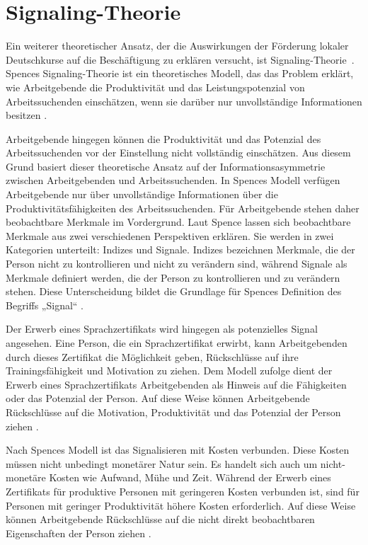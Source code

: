 \section{Signaling-Theorie}
\label{cha:Signal}

Ein weiterer theoretischer Ansatz, der die Auswirkungen der Förderung lokaler Deutschkurse auf die Beschäftigung zu erklären versucht, ist Signaling-Theorie~\parencite{Spence1973}. Spences Signaling-Theorie ist ein theoretisches Modell, das das Problem erklärt, wie Arbeitgebende die Produktivität und das Leistungspotenzial von Arbeitssuchenden einschätzen, wenn sie darüber nur unvollständige Informationen besitzen \parencite[55--56]{Spence1973}.

Arbeitgebende hingegen können die Produktivität und das Potenzial des Arbeitssuchenden vor der Einstellung nicht vollständig einschätzen. Aus diesem Grund basiert dieser theoretische Ansatz auf der Informationsasymmetrie zwischen Arbeitgebenden und Arbeitssuchenden. In Spences Modell verfügen Arbeitgebende nur über unvollständige Informationen über die Produktivitätsfähigkeiten des Arbeitssuchenden. Für Arbeitgebende stehen daher beobachtbare Merkmale im Vordergrund. Laut Spence lassen sich beobachtbare Merkmale aus zwei verschiedenen Perspektiven erklären. Sie werden in zwei Kategorien unterteilt: Indizes und Signale. Indizes bezeichnen Merkmale, die der Person nicht zu kontrollieren und nicht zu verändern sind, während Signale als Merkmale definiert werden, die der Person zu kontrollieren und zu verändern stehen. Diese Unterscheidung bildet die Grundlage für Spences Definition des Begriffs „Signal“ \parencite[357--358]{Spence1973}.

Der Erwerb eines Sprachzertifikats wird hingegen als potenzielles Signal angesehen. Eine Person, die ein Sprachzertifikat erwirbt, kann Arbeitgebenden durch dieses Zertifikat die Möglichkeit geben, Rückschlüsse auf ihre Trainingsfähigkeit und Motivation zu ziehen. Dem Modell zufolge dient der Erwerb eines Sprachzertifikats Arbeitgebenden als Hinweis auf die Fähigkeiten oder das Potenzial der Person. Auf diese Weise können Arbeitgebende Rückschlüsse auf die Motivation, Produktivität und das Potenzial der Person ziehen \parencite[357--359]{Spence1973}.

Nach Spences Modell ist das Signalisieren mit Kosten verbunden. Diese Kosten müssen nicht unbedingt monetärer Natur sein. Es handelt sich auch um nicht-monetäre Kosten wie Aufwand, Mühe und Zeit. Während der Erwerb eines Zertifikats für produktive Personen mit geringeren Kosten verbunden ist, sind für Personen mit geringer Produktivität höhere Kosten erforderlich. Auf diese Weise können Arbeitgebende Rückschlüsse auf die nicht direkt beobachtbaren Eigenschaften der Person ziehen \parencite[359]{Spence1973}.


